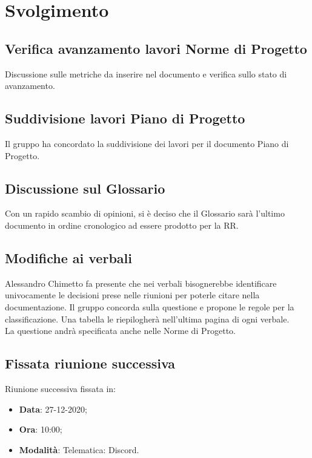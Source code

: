 \documentclass[]{article}
\begin{document}
	\newpage

	\section{Svolgimento}
		\subsection{Verifica avanzamento lavori Norme di Progetto}
		Discussione sulle metriche da inserire nel documento e verifica sullo stato di avanzamento.

		\subsection{Suddivisione lavori Piano di Progetto}
		Il gruppo ha concordato la suddivisione dei lavori per il documento Piano di Progetto.

		\subsection{Discussione sul Glossario}
		Con un rapido scambio di opinioni, si è deciso che il Glossario sarà l'ultimo documento in ordine cronologico ad essere prodotto per la RR.

		\subsection{Modifiche ai verbali}
		Alessandro Chimetto fa presente che nei verbali bisognerebbe identificare univocamente le decisioni prese nelle riunioni per poterle citare nella documentazione. Il gruppo concorda sulla questione e propone le regole per la classificazione. Una tabella le riepilogherà nell'ultima pagina di ogni verbale.\\La questione andrà specificata anche nelle Norme di Progetto.

		\subsection{Fissata riunione successiva}
		Riunione successiva fissata in:
		\begin{itemize}
			\item \textbf{Data}: 27-12-2020;
			\item \textbf{Ora}: 10:00;
			\item \textbf{Modalità}: Telematica: Discord.
		\end{itemize}
	
	\newpage
	
\end{document}
